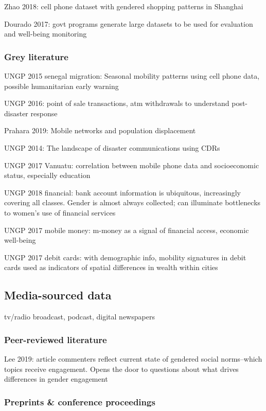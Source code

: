 \documentclass{article}
\begin{document}
Zhao 2018: cell phone dataset with gendered shopping patterns in Shanghai

Dourado 2017: govt programs generate large datasets to be used for evaluation and well-being monitoring


\subsubsection{Grey literature}

UNGP 2015 senegal migration: Seasonal mobility patterns using cell phone data, possible humanitarian early warning

UNGP 2016: point of sale transactions, atm withdrawals to understand post-disaster response

Prahara 2019: Mobile networks and population displacement

UNGP 2014: The landscape of disaster communications using CDRs

UNGP 2017 Vanuatu: correlation between mobile phone data and socioeconomic status, especially education

UNGP 2018 financial: bank account information is ubiquitous, increasingly covering all classes. Gender is almost always collected; can illuminate bottlenecks to women's use of financial services

UNGP 2017 mobile money: m-money as a signal of financial access, economic well-being

UNGP 2017 debit cards: with demographic info,  mobility signatures in debit cards used as indicators of spatial differences in wealth within cities

	\subsection{Media-sourced data}

tv/radio broadcast, podcast, digital newspapers

\subsubsection{Peer-reviewed literature}


Lee 2019: article commenters reflect current state of gendered social norms--which topics receive engagement. Opens the door to questions about what drives differences in gender engagement

\subsubsection{Preprints \& conference proceedings}
\end{document}
